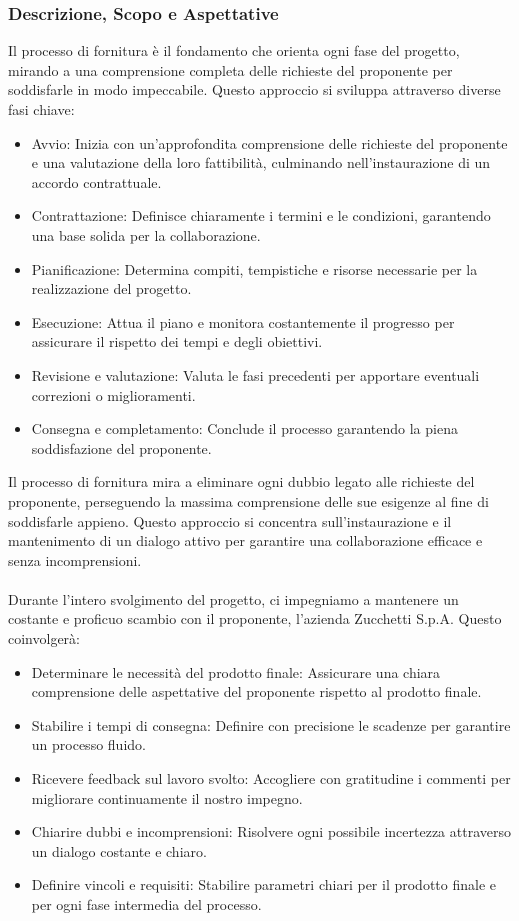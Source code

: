 \documentclass{article}
\begin{document}
\subsubsection{Descrizione, Scopo e Aspettative }
Il processo di fornitura è il fondamento che orienta ogni fase del progetto, mirando a una comprensione completa delle richieste del proponente per soddisfarle in modo impeccabile. Questo approccio si sviluppa attraverso diverse fasi chiave:
\begin{itemize}
    \item{Avvio:} Inizia con un'approfondita comprensione delle richieste del proponente e una valutazione della loro fattibilità, culminando nell'instaurazione di un accordo contrattuale.
    \item{Contrattazione:} Definisce chiaramente i termini e le condizioni, garantendo una base solida per la collaborazione.
    \item{Pianificazione:} Determina compiti, tempistiche e risorse necessarie per la realizzazione del progetto.
    \item{Esecuzione:} Attua il piano e monitora costantemente il progresso per assicurare il rispetto dei tempi e degli obiettivi.
    \item{Revisione e valutazione:} Valuta le fasi precedenti per apportare eventuali correzioni o miglioramenti. 
    \item{Consegna e completamento:} Conclude il processo garantendo la piena soddisfazione del proponente.
\end{itemize}
Il processo di fornitura mira a eliminare ogni dubbio legato alle richieste del proponente, perseguendo la massima comprensione delle sue esigenze al fine di soddisfarle appieno. Questo approccio si concentra sull'instaurazione e il mantenimento di un dialogo attivo per garantire una collaborazione efficace e senza incomprensioni.\\\\
Durante l'intero svolgimento del progetto, ci impegniamo a mantenere un costante e proficuo scambio con il proponente, l'azienda Zucchetti S.p.A. Questo coinvolgerà:
\begin{itemize}
    \item Determinare le necessità del prodotto finale: Assicurare una chiara comprensione delle aspettative del proponente rispetto al prodotto finale.
    \item Stabilire i tempi di consegna: Definire con precisione le scadenze per garantire un processo fluido.
    \item Ricevere feedback sul lavoro svolto: Accogliere con gratitudine i commenti per migliorare continuamente il nostro impegno.
    \item Chiarire dubbi e incomprensioni: Risolvere ogni possibile incertezza attraverso un dialogo costante e chiaro.
    \item Definire vincoli e requisiti: Stabilire parametri chiari per il prodotto finale e per ogni fase intermedia del processo.
\end{itemize}
\end{document}
